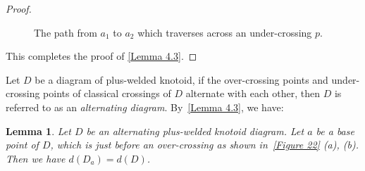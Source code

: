 \documentclass[11pt]{amsart}
\theoremstyle{noparens}
\newtheorem{lemma}{Lemma}[section]
\numberwithin{equation}{section}
\numberwithin{equation}{section}
\begin{document}
\begin{proof}
\begin{figure}[htbp]
\begin{center}
\caption{The path from $a_1$ to $a_2$ which traverses across an under-crossing $p$.}
\label{Figure 21}
\end{center}
\end{figure}	 
This completes the proof of \cref{Lemma 4.3}.
\end{proof}		

Let $D$ be a diagram of plus-welded  knotoid, if the over-crossing points and under-crossing points of classical crossings of $D$ alternate with each other, then $D$ is referred to as an \textit{alternating diagram}. 
By~\cref{Lemma 4.3}, we have: 

\begin{lemma} \label{Lemma 4.4}
Let $D$ be an alternating plus-welded knotoid diagram. Let $a$ be a base point of $D$, which is just before an over-crossing as shown in~\cref{Figure 22} (a), (b). Then we have $d(D_a)=d(D)$. 
\end{lemma}
\end{document}
